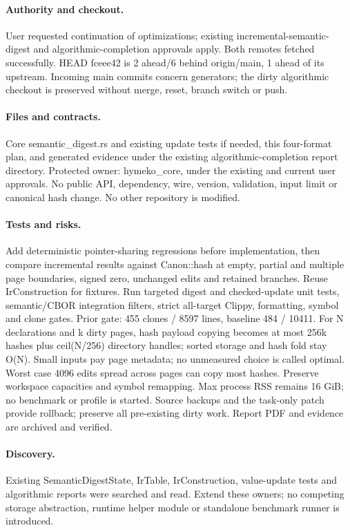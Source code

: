 \documentclass[11pt,a4paper]{article}
\begin{document}
\paragraph{Authority and checkout.} User requested continuation of optimizations;
existing incremental-semantic-digest and algorithmic-completion approvals apply.
Both remotes fetched successfully. HEAD fceee42 is 2 ahead/6 behind origin/main,
1 ahead of its upstream. Incoming main commits concern generators; the dirty
algorithmic checkout is preserved without merge, reset, branch switch or push.
\paragraph{Files and contracts.} Core semantic\_digest.rs and existing update tests
if needed, this four-format plan, and generated evidence under the existing
algorithmic-completion report directory. Protected owner: hymeko\_core, under the
existing and current user approvals. No public API, dependency, wire, version,
validation, input limit or canonical hash change. No other repository is modified.
\paragraph{Tests and risks.} Add deterministic pointer-sharing regressions before
implementation, then compare incremental results against Canon::hash at empty,
partial and multiple page boundaries, signed zero, unchanged edits and retained
branches. Reuse IrConstruction for fixtures. Run targeted digest and checked-update
unit tests, semantic/CBOR integration filters, strict all-target Clippy, formatting,
symbol and clone gates. Prior gate: 455 clones / 8597 lines, baseline 484 / 10411.
For N declarations and k dirty pages, hash payload copying becomes at most 256k
hashes plus ceil(N/256) directory handles; sorted storage and hash fold stay O(N).
Small inputs pay page metadata; no unmeasured choice is called optimal. Worst case
4096 edits spread across pages can copy most hashes. Preserve workspace capacities
and symbol remapping. Max process RSS remains 16 GiB; no benchmark or profile is
started. Source backups and the task-only patch provide rollback; preserve all
pre-existing dirty work. Report PDF and evidence are archived and verified.
\paragraph{Discovery.} Existing SemanticDigestState, IrTable, IrConstruction,
value-update tests and algorithmic reports were searched and read. Extend these
owners; no competing storage abstraction, runtime helper module or standalone
benchmark runner is introduced.
\end{document}
